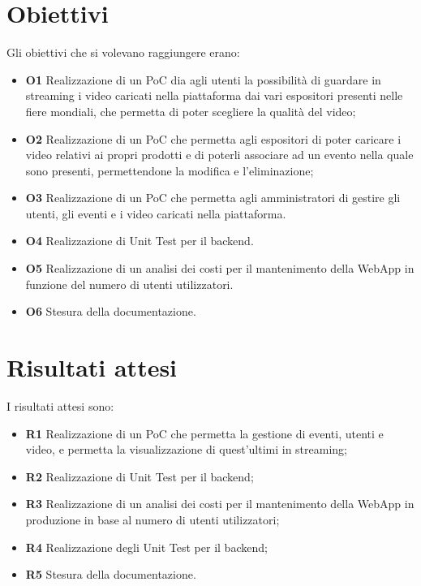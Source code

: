 \section{Obiettivi}
\label{sec:obiettivi}
Gli obiettivi che si volevano raggiungere erano:
\begin{itemize}
    \item \textbf{O1} Realizzazione di un PoC dia agli utenti la possibilità di guardare in streaming i video caricati nella piattaforma dai vari espositori presenti nelle fiere mondiali, che permetta di poter scegliere la qualità del video;
    \item \textbf{O2} Realizzazione di un PoC che permetta agli espositori di poter caricare i video relativi ai propri prodotti e di poterli associare ad un evento nella quale sono presenti, permettendone la modifica e l'eliminazione;
    \item \textbf{O3} Realizzazione di un PoC che permetta agli amministratori di gestire gli utenti, gli eventi e i video caricati nella piattaforma.
    \item \textbf{O4} Realizzazione di Unit Test per il backend.
    \item \textbf{O5} Realizzazione di un analisi dei costi per il mantenimento della WebApp in funzione del numero di utenti utilizzatori.
    \item \textbf{O6} Stesura della documentazione.
\end{itemize}
\section{Risultati attesi}
\label{sec:risultati-attesi}
I risultati attesi sono:
\begin{itemize}
    \item \textbf{R1} Realizzazione di un PoC che permetta la gestione di eventi, utenti e video, e permetta la visualizzazione di quest'ultimi in streaming;
    \item \textbf{R2} Realizzazione di Unit Test per il backend;
    \item \textbf{R3} Realizzazione di un analisi dei costi per il mantenimento della WebApp in produzione in base al numero di utenti utilizzatori;
    \item \textbf{R4} Realizzazione degli Unit Test per il backend;
    \item \textbf{R5} Stesura della documentazione.
\end{itemize}


